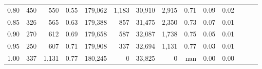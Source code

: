 \begin{tabular}{rrrrrrrrrrrrrr}
0.80 &     450 &    550 &  0.55 &  179,062 &    1,183 &  30,910 &   2,915 &  0.71 &  0.09 &      0.02 \\
0.85 &     326 &    565 &  0.63 &  179,388 &      857 &  31,475 &   2,350 &  0.73 &  0.07 &      0.01 \\
0.90 &     270 &    612 &  0.69 &  179,658 &      587 &  32,087 &   1,738 &  0.75 &  0.05 &      0.01 \\
0.95 &     250 &    607 &  0.71 &  179,908 &      337 &  32,694 &   1,131 &  0.77 &  0.03 &      0.01 \\
1.00 &     337 &  1,131 &  0.77 &  180,245 &        0 &  33,825 &       0 &   nan &  0.00 &      0.00 \\
\bottomrule
\end{tabular}
